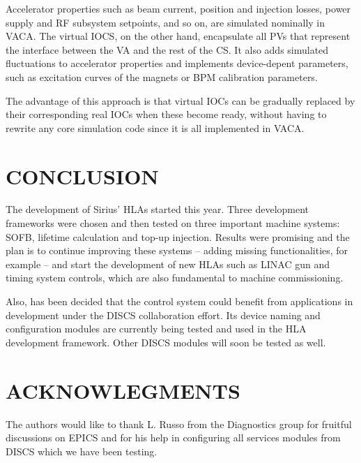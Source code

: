 \documentclass[a4paper,
              ]{jacow}
\begin{document}
Accelerator properties such as beam current, position and injection losses, power supply and RF subsystem setpoints,
and so on, are simulated nominally in VACA. The virtual IOCS, on the other hand, encapsulate all PVs that represent the
interface between the VA and the rest of the CS. It also adds simulated fluctuations to accelerator properties and implements
device-depent parameters, such as excitation curves of the magnets or BPM calibration parameters.

The advantage of this approach is that virtual IOCs can be gradually replaced by their corresponding real IOCs when these become
ready, without having to rewrite any core simulation code since it is all implemented in VACA.
\section{CONCLUSION}
The development of Sirius' HLAs started this year. Three development frameworks were chosen and then tested on three important machine systems: SOFB, lifetime calculation and top-up injection. Results were promising and the plan is to continue improving these systems -- adding missing functionalities, for example -- and start the development of new HLAs such as LINAC gun and timing system controls, which are also fundamental to machine commissioning.

Also, has been decided that the control system could benefit from applications in development under the DISCS collaboration effort. Its device naming and configuration modules are currently being tested and used in the HLA development framework. Other DISCS modules will soon be tested as well.

\section{ACKNOWLEGMENTS}

The authors would like to thank L. Russo from the Diagnostics group for fruitful discussions on EPICS and for his help in configuring all services modules from DISCS which we have been testing.
\end{document}

